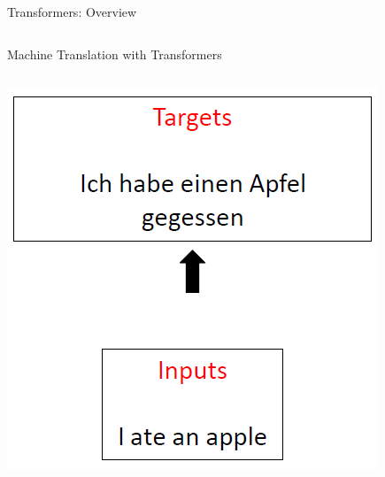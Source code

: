 \begin{frame}[allowframebreaks]{Transformers: Overview}
\begin{columns}[T,onlytextwidth]
\begin{column}{0.5\textwidth}
        \end{column}
    \end{columns}
\end{frame}

\begin{frame}[allowframebreaks]{Machine Translation with Transformers}

    \begin{columns}
        \begin{column}{0.6\textwidth}
            \centering
            \includegraphics[width=\textwidth, height=0.9\textheight,keepaspectratio]{images/nlp/machine-translation.png}
        \end{column}
        \begin{column}{0.5\textwidth}
            \centering

\end{column}
\end{columns}
\end{frame}
